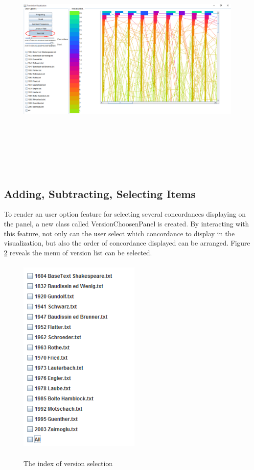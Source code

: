 \begin{figure}[h]
	\centering	
	\includegraphics[width=18cm, height=12cm]{Figs/Text-On-Off}\\[1ex]
	\caption{}
	\label{fig:textOnOff}
\end{figure} 

\subsection{Adding, Subtracting, Selecting Items}

To render an user option feature for selecting several concordances displaying on the panel, a new class called VersionChoosenPanel is created. By interacting with this feature, not only can the user select which concordance to display in the visualization, but also the order of concordance displayed can be arranged. Figure
\ref{fig:versionChoosPanel} reveals the menu of version list can be selected. 
\begin{figure}[h]
	\centering	
	\includegraphics[width=6cm, height=10cm]{Figs/VersionChoosePanel}\\[1ex]
	\caption{The index of version selection}
	\label{fig:versionChoosPanel}
\end{figure} 

